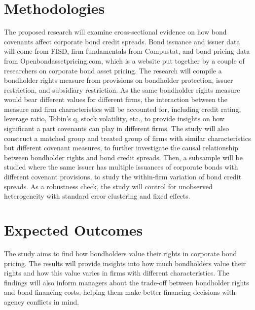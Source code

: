 \documentclass[a4paper, 10pt, authoryear]{elsarticle}
\begin{document}
\section{Methodologies}
The proposed research will examine cross-sectional evidence on how bond covenants affect corporate bond credit spreads. Bond issuance and issuer data will come from FISD, firm fundamentals from Compustat, and bond pricing data from Openbondassetpricing.com, which is a website put together by a couple of researchers on corporate bond asset pricing. The research will compile a bondholder rights measure from provisions on bondholder protection, issuer restriction, and subsidiary restriction. As the same bondholder rights measure would bear different values for different firms, the interaction between the measure and firm characteristics will be accounted for, including credit rating, leverage ratio, Tobin's q, stock volatility, etc., to provide insights on how significant a part covenants can play in different firms. The study will also construct a matched group and treated group of firms with similar characteristics but different covenant measures, to further investigate the causal relationship between bondholder rights and bond credit spreads. Then, a subsample will be studied where the same issuer has multiple issuances of corporate bonds with different covenant provisions, to study the within-firm variation of bond credit spreads. As a robustness check, the study will control for unobserved heterogeneity with standard error clustering and fixed effects.

\section{Expected Outcomes}
The study aims to find how bondholders value their rights in corporate bond pricing. The results will provide insights into how much bondholders value their rights and how this value varies in firms with different characteristics. The findings will also inform managers about the trade-off between bondholder rights and bond financing costs, helping them make better financing decisions with agency conflicts in mind.

\clearpage

\end{document}
